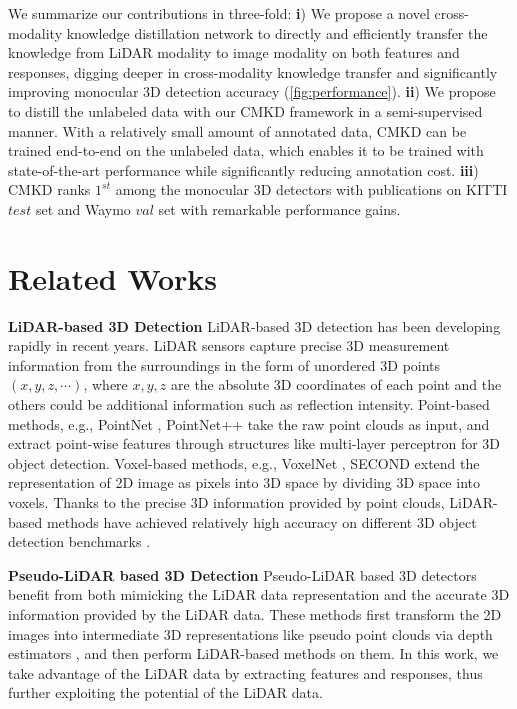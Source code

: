 \documentclass[runningheads]{llncs}
\begin{document}
We summarize our contributions in three-fold:
\textbf{i}) We propose a novel cross-modality knowledge distillation network to directly and efficiently transfer the knowledge from LiDAR modality to image modality on both features and responses,
digging deeper in cross-modality knowledge transfer and significantly improving monocular 3D detection accuracy (\cref{fig:performance}).
\textbf{ii}) We propose to distill the unlabeled data with our CMKD framework in a semi-supervised manner.
With a relatively small amount of annotated data, CMKD can be trained end-to-end on the unlabeled data, which enables it to be trained with state-of-the-art performance while significantly reducing annotation cost.
\textbf{iii}) CMKD ranks $1^{st}$ among the monocular 3D detectors with publications on KITTI $test$ set \cite{KITTI} and Waymo $val$ set \cite{Waymo} with remarkable performance gains.

\section{Related Works}

\textbf{LiDAR-based 3D Detection}\quad
LiDAR-based 3D detection \cite{pvrcnn,pointrcnn,pointnet,voxelnet,li20203d,li2021anchor,li2021voxel,li2021p2v} has been developing rapidly in recent years. 
LiDAR sensors capture precise 3D measurement information from the surroundings in the form of unordered 3D points $(x,y,z,\cdots)$,  where $x,y,z$ are the absolute 3D coordinates of each point and the others could be additional information such as reflection intensity. 
Point-based methods, e.g., PointNet \cite{pointnet}, PointNet++ \cite{pointnet++} take the raw point clouds as input, and extract point-wise features through structures like multi-layer perceptron for 3D object detection. 
Voxel-based methods, e.g., VoxelNet \cite{voxelnet}, SECOND \cite{second} extend the representation of 2D image as pixels into 3D space by dividing 3D space into voxels.
Thanks to the precise 3D information provided by point clouds, LiDAR-based methods have achieved relatively high accuracy on different 3D object detection benchmarks \cite{KITTI,Waymo,nuscenes}.

\noindent\textbf{Pseudo-LiDAR based 3D Detection}\quad
Pseudo-LiDAR based 3D detectors \cite{PL,PL++,AMOD,monopl,chen2022pseudo} benefit from both mimicking the LiDAR data representation and the accurate 3D information provided by the LiDAR data.
These methods first transform the 2D images into intermediate 3D representations like pseudo point clouds via depth estimators \cite{DORN,bts}, and then perform LiDAR-based methods on them. 
In this work, we take advantage of the LiDAR data by extracting features and responses, thus further exploiting the potential of the LiDAR data.
\end{document}
